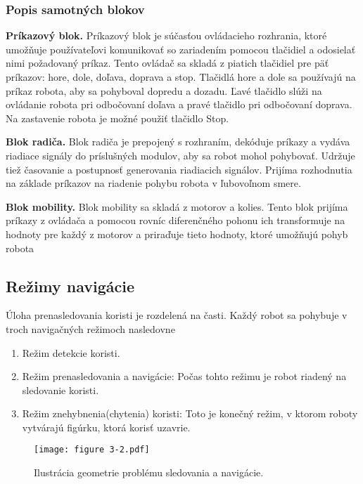 \subsubsection{Popis samotných blokov}

\textbf{Príkazový blok.}
Príkazový blok je súčasťou ovládacieho rozhrania, ktoré umožňuje používateľovi komunikovať so zariadením pomocou tlačidiel a odosielať nimi požadovaný príkaz. Tento ovládač sa skladá z piatich tlačidiel pre päť príkazov: hore, dole, doľava, doprava a stop. Tlačidlá hore a dole sa používajú na príkaz robota, aby sa pohyboval dopredu a dozadu. Ľavé tlačidlo slúži na ovládanie robota pri odbočovaní doľava a pravé tlačidlo pri odbočovaní doprava. Na zastavenie robota je možné použiť tlačidlo Stop.
\vspace{1mm}

\justifying
\noindent
\textbf{Blok radiča.}
Blok radiča je prepojený s rozhraním, dekóduje príkazy a vydáva riadiace signály do príslušných modulov, aby sa robot
mohol pohybovať. Udržuje tiež časovanie a postupnosť generovania riadiacich signálov. Prijíma rozhodnutia na základe
príkazov na riadenie pohybu robota v ľubovoľnom smere.
\vspace{1mm}

\justifying
\noindent
\textbf{Blok mobility.}
Blok mobility sa skladá z motorov a kolies. Tento blok prijíma príkazy z ovládača a pomocou rovníc diferenčného pohonu
ich transformuje na hodnoty pre každý z motorov a priraďuje tieto hodnoty, ktoré umožňujú pohyb robota


\subsection{Režimy navigácie}
Úloha prenasledovania koristi je rozdelená na časti. Každý robot sa pohybuje v troch navigačných režimoch nasledovne
\begin{enumerate}
\item Režim detekcie koristi.
\item Režim prenasledovania a navigácie: Počas tohto režimu je robot riadený na sledovanie koristi.
\item Režim znehybnenia(chytenia) koristi: Toto je konečný režim, v ktorom roboty vytvárajú figúrku, ktorá korisť uzavrie.
\end{enumerate}

\begin{figure}[ht!]
\centering
\texttt{[image: figure 3-2.pdf]}
\caption{Ilustrácia geometrie problému sledovania a navigácie.}
\label{o:32}
\end{figure}

